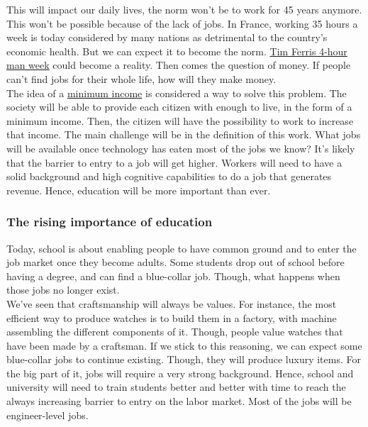 \documentclass[12pt]{article}
\begin{document}
This will impact our daily lives, the norm won't be to work for 45 years anymore.
This won't be possible because of the lack of jobs. In France, working 35 hours
a week is today considered by many nations as detrimental to the country's economic
health. But we can expect it to become the norm. \href{http://fourhourworkweek.com/}
{Tim Ferris 4-hour man week} could become a reality.
Then comes the question of money. If people can't find jobs for their whole life,
how will they make money. \\

 The idea of a \href{http://www.globalresearch.ca/an-unconditional-citizens-income-a-basic-guaranteed-minimum-income/5423130}
{minimum income} is considered a way to solve this problem. The society will be
able to provide each citizen with enough to live, in the form of a minimum income.
Then, the citizen will have the possibility to work to increase that income.
The main challenge will be in the definition of this work. What jobs will be
available once technology has eaten most of the jobs we know? It's likely that
the barrier to entry to a job will get higher. Workers will need to have a solid
background and high cognitive capabilities to do a job that generates revenue.
Hence, education will be more important than ever.

\subsubsection{The rising importance of education}

Today, school is about enabling people to have common ground and to enter the
job market once they become adults. Some students drop out of school before
having a degree, and can find a blue-collar job. Though, what happens when those
jobs no longer exist.\\

We've seen that craftsmanship will always be values. For instance, the most
efficient way to produce watches is to build them in a factory, with machine
assembling the different components of it. Though, people value watches that have
been made by a craftsman. If we stick to this reasoning, we can expect some
blue-collar jobs to continue existing. Though, they will produce luxury items.
For the big part of it, jobs will require a very strong background. Hence,
school and university will need to train students better and better with time to
reach the always increasing barrier to entry on the labor market. Most of the
jobs will be engineer-level jobs.
\end{document}
